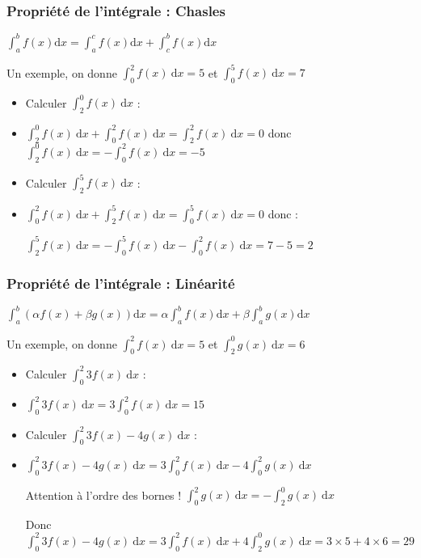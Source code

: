 \documentclass[11pt, hyperref={urlcolor=red,%
            linkcolor=blue, %
            colorlinks=true}]{beamer}
\newcommand{\dx}{\ensuremath{\text{d}x}}		%
\newcommand{\integralex}[3]{\int_{#1}^{#2} #3 \ \dx}
\begin{document}
\begin{frame}
\frametitle{Propriété de l'intégrale : Chasles}
\label{chasles}

\begin{theorem}
$\displaystyle\int_{a}^{b}f(x)\dx=\displaystyle\int_{a}^{c}f(x)\dx+\displaystyle\int_{c}^{b}f(x)\dx$
\end{theorem}

Un exemple, on donne $\integralex{0}{2}{f(x)}=5$ et $\integralex{0}{5}{f(x)}=7$ 

\begin{itemize}

\item  Calculer  $\integralex{2}{0}{f(x)}$ :
\pause \item $\integralex{2}{0}{f(x)} + \integralex{0}{2}{f(x)}=\integralex{2}{2}{f(x)}=0$ donc $\integralex{2}{0}{f(x)}=-\integralex{0}{2}{f(x)}=-5$
\item  Calculer  $\integralex{2}{5}{f(x)}$ :
\pause \item $\integralex{0}{2}{f(x)} + \integralex{2}{5}{f(x)}=\integralex{0}{5}{f(x)}=0$ donc :

$\integralex{2}{5}{f(x)}=-\integralex{0}{5}{f(x)}-\integralex{0}{2}{f(x)}=7-5=2$
\end{itemize}


\end{frame}


\begin{frame}
\frametitle{Propriété de l'intégrale : Linéarité}
\label{linearite}

\begin{theorem}
 $\displaystyle\int_{a}^{b} \left(\alpha f(x)+ \beta g(x)\right)\dx=\alpha \displaystyle\int_{a}^{b}f(x)\dx+\beta \displaystyle\int_{a}^{b}g(x)\dx$
\end{theorem}

Un exemple, on donne $\integralex{0}{2}{f(x)}=5$ et $\integralex{2}{0}{g(x)}=6$ 

\begin{itemize}

\item  Calculer  $\integralex{0}{2}{3f(x)}$ :
\pause \item $\integralex{0}{2}{3f(x)} = 3 \integralex{0}{2}{f(x)}=15$  
\item  Calculer  $\integralex{0}{2}{3f(x)-4g(x)}$ :
\pause \item $\integralex{0}{2}{3f(x)-4g(x)}=3 \integralex{0}{2}{f(x)} - 4 \integralex{0}{2}{g(x)}$

 
\bcattention{} Attention  à l'ordre des bornes ! $\integralex{0}{2}{g(x)} = - \integralex{2}{0}{g(x)}$

Donc $\integralex{0}{2}{3f(x)-4g(x)}=3 \integralex{0}{2}{f(x)} + 4 \integralex{2}{0}{g(x)}=3 \times 5 + 4 \times 6 = 29$

\end{itemize}


\end{frame}
\end{document}

